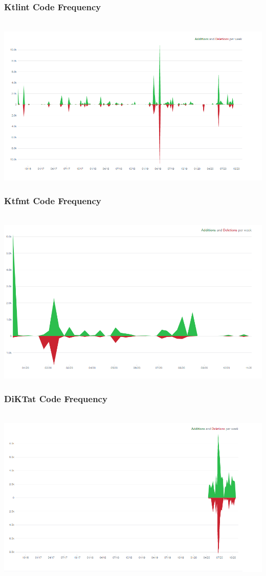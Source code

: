 \subsubsection{Ktlint Code Frequency}
\hfill\\
    \includegraphics[scale=0.5]{pictures/ktlint.png}
\subsubsection{Ktfmt Code Frequency}
\hfill\\
  \includegraphics[scale=0.5]{pictures/ktfmt.png}
\subsubsection{DiKTat Code Frequency}
\hfill\\
  \includegraphics[scale=0.5]{pictures/diktat.png}
